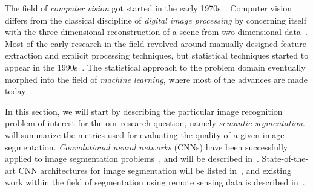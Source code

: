 The field of \textit{computer vision} got started in the early 1970s~\cite[p.~10]{computer_vision_history}.
Computer vision differs from the classical discipline of \textit{digital image processing} by concerning itself with the three-dimensional reconstruction of a scene from two-dimensional data~\cite[p.~10]{computer_vision_history}.
Most of the early research in the field revolved around manually designed feature extraction and explicit processing techniques, but statistical techniques started to appear in the 1990s~\cite[p.~15]{computer_vision_history}.
The statistical approach to the problem domain eventually morphed into the field of \textit{machine learning}, where most of the advances are made today~\cite[p.~17]{computer_vision_history}.

In this section, we will start by describing the particular image recognition problem of interest for the our research question, namely \textit{semantic segmentation}.
 will summarize the metrics used for evaluating the quality of a given image segmentation.
\textit{Convolutional neural networks} (CNNs) have been successfully applied to image segmentation problems~\cite[p.~1]{image_recognition}, and will be described in~.
State-of-the-art CNN architectures for image segmentation will be listed in~, and existing work within the field of segmentation using remote sensing data is described in~.
